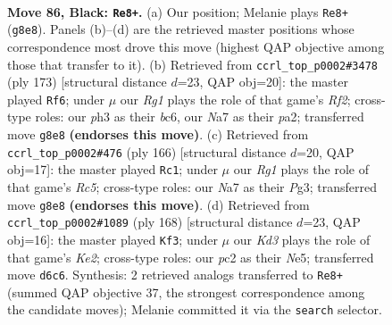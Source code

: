 \documentclass[11pt]{article}
\begin{document}
\clearpage

\begin{figure}[p]\centering
\begin{subfigure}{0.46\textwidth}\centering
\resizebox{\linewidth}{!}{%
\newchessgame
\chessboard[
  setfen={6r1/n7/P2k4/8/4K3/1R4PP/2P1B3/8 b - - 6 86},
  showmover=false,
  pgfstyle=straightmove, color=movearrow, markmove={g8-e8}
]}
\caption{}
\end{subfigure}\hfill
\begin{subfigure}{0.46\textwidth}\centering
\resizebox{\linewidth}{!}{%
\newchessgame
\chessboard[
  setfen={5b2/5r2/1pB5/8/3k4/8/P3RPK1/8 b - - 8 87},
  showmover=false,
  pgfstyle=straightmove, color=movearrow, markmove={f7-f6}
]}
\caption{}
\end{subfigure}
\\[4pt]
\begin{subfigure}{0.46\textwidth}\centering
\resizebox{\linewidth}{!}{%
\newchessgame
\chessboard[
  setfen={5k2/8/5p2/2R3pp/8/6P1/8/3b2K1 w - - 2 84},
  showmover=false,
  pgfstyle=straightmove, color=movearrow, markmove={c5-c1}
]}
\caption{}
\end{subfigure}\hfill
\begin{subfigure}{0.46\textwidth}\centering
\resizebox{\linewidth}{!}{%
\newchessgame
\chessboard[
  setfen={5R2/8/8/4N3/3r1p2/6pk/4K3/8 w - - 2 85},
  showmover=false,
  pgfstyle=straightmove, color=movearrow, markmove={e2-f3}
]}
\caption{}
\end{subfigure}
\caption{\textbf{Move 86, Black: \texttt{Re8+}.} (a) Our position; Melanie plays \texttt{Re8+} (\texttt{g8e8}). Panels (b)--(d) are the retrieved master positions whose correspondence most drove this move (highest QAP objective among those that transfer to it). (b) Retrieved from \texttt{ccrl\_top\_p0002\#3478} (ply 173) [structural distance $d$=23, QAP obj=20]: the master played \texttt{Rf6}; under $\mu$ our \emph{Rg1} plays the role of that game's \emph{Rf2}; cross-type roles: our \emph{p}h3 as their \emph{b}c6, our \emph{N}a7 as their \emph{p}a2; transferred move \texttt{g8e8} \textbf{(endorses this move)}. (c) Retrieved from \texttt{ccrl\_top\_p0002\#476} (ply 166) [structural distance $d$=20, QAP obj=17]: the master played \texttt{Rc1}; under $\mu$ our \emph{Rg1} plays the role of that game's \emph{Rc5}; cross-type roles: our \emph{N}a7 as their \emph{P}g3; transferred move \texttt{g8e8} \textbf{(endorses this move)}. (d) Retrieved from \texttt{ccrl\_top\_p0002\#1089} (ply 168) [structural distance $d$=23, QAP obj=16]: the master played \texttt{Kf3}; under $\mu$ our \emph{Kd3} plays the role of that game's \emph{Ke2}; cross-type roles: our \emph{p}c2 as their \emph{N}e5; transferred move \texttt{d6c6}. Synthesis: 2 retrieved analogs transferred to \texttt{Re8+} (summed QAP objective 37, the strongest correspondence among the candidate moves); Melanie committed it via the \texttt{search} selector.}
\label{fig:thought-m171}
\end{figure}
\end{document}
